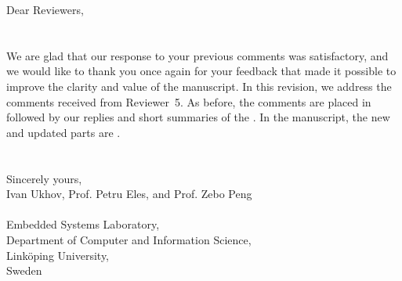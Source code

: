 Dear Reviewers,
\\
\\
\\
\noindent We are glad that our response to your previous comments was satisfactory, and we would like to thank you once again for your feedback that made it possible to improve the clarity and value of the manuscript.
In this revision, we address the comments received from Reviewer~5.
As before, the comments are placed in  followed by our replies and short summaries of the .
In the manuscript, the new and updated parts are .
\\
\\
\\
\noindent Sincerely yours,\\
Ivan Ukhov, Prof. Petru Eles, and Prof. Zebo Peng
\\
\\
\noindent Embedded Systems Laboratory,\\
Department of Computer and Information Science,\\
Link\"{o}ping University,\\
Sweden
